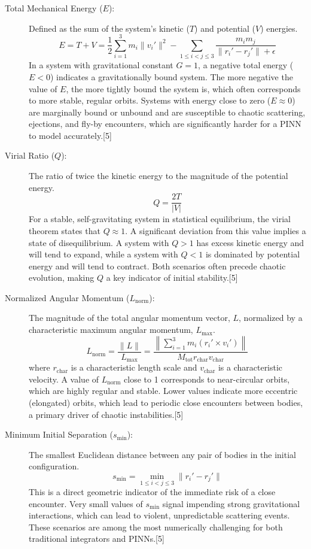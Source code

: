\documentclass[11pt, letterpaper]{article}
\begin{document}
\begin{description}
    \item[Total Mechanical Energy ($E$):] Defined as the sum of the system's kinetic ($T$) and potential ($V$) energies.
    $$E = T + V = \frac{1}{2}\sum_{i=1}^{3}m_{i}\lVert v_{i}'\rVert^{2} - \sum_{1\le i<j\le3}\frac{m_{i}m_{j}}{\lVert r_{i}'-r_{j}'\rVert+\epsilon}$$
    In a system with gravitational constant $G=1$, a negative total energy ($E < 0$) indicates a gravitationally bound system. The more negative the value of $E$, the more tightly bound the system is, which often corresponds to more stable, regular orbits. Systems with energy close to zero ($E \approx 0$) are marginally bound or unbound and are susceptible to chaotic scattering, ejections, and fly-by encounters, which are significantly harder for a PINN to model accurately.[5]

    \item[Virial Ratio ($Q$):] The ratio of twice the kinetic energy to the magnitude of the potential energy.
    $$Q = \frac{2T}{|V|}$$
    For a stable, self-gravitating system in statistical equilibrium, the virial theorem states that $Q \approx 1$. A significant deviation from this value implies a state of disequilibrium. A system with $Q > 1$ has excess kinetic energy and will tend to expand, while a system with $Q < 1$ is dominated by potential energy and will tend to contract. Both scenarios often precede chaotic evolution, making $Q$ a key indicator of initial stability.[5]

    \item[Normalized Angular Momentum ($L_{\text{norm}}$):] The magnitude of the total angular momentum vector, $L$, normalized by a characteristic maximum angular momentum, $L_{\text{max}}$.
    $$L_{\text{norm}} = \frac{\lVert L\rVert}{L_{\text{max}}} = \frac{\left\lVert\sum_{i=1}^{3}m_{i}(r_{i}'\times v_{i}')\right\rVert}{M_{\text{tot}}r_{\text{char}}v_{\text{char}}}$$
    where $r_{\text{char}}$ is a characteristic length scale and $v_{\text{char}}$ is a characteristic velocity. A value of $L_{\text{norm}}$ close to 1 corresponds to near-circular orbits, which are highly regular and stable. Lower values indicate more eccentric (elongated) orbits, which lead to periodic close encounters between bodies, a primary driver of chaotic instabilities.[5]

    \item[Minimum Initial Separation ($s_{\text{min}}$):] The smallest Euclidean distance between any pair of bodies in the initial configuration.
    $$s_{\text{min}} = \min_{1\le i<j\le3}\lVert r_{i}'-r_{j}'\rVert$$
    This is a direct geometric indicator of the immediate risk of a close encounter. Very small values of $s_{\text{min}}$ signal impending strong gravitational interactions, which can lead to violent, unpredictable scattering events. These scenarios are among the most numerically challenging for both traditional integrators and PINNs.[5]


\end{description}
\end{document}
